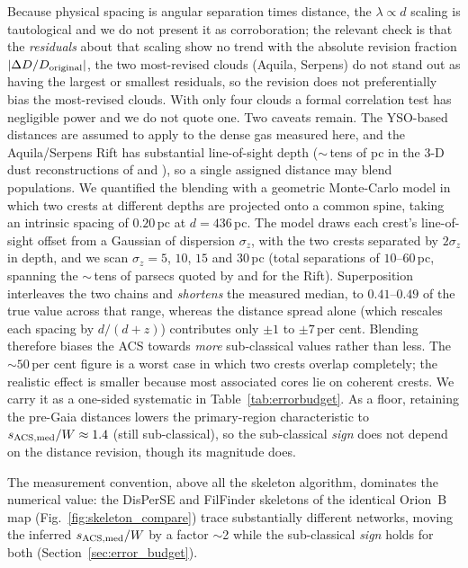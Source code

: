 \documentclass[usenatbib,twoside,twocolumn]{mnras}
\begin{document}
Because physical spacing is angular separation times distance, the $\lambda\propto d$ scaling is tautological and we do not present it as corroboration; the relevant check is that the \emph{residuals} about that scaling show no trend with the absolute revision fraction $|\Delta D/D_{\rm original}|$, the two most-revised clouds (Aquila, Serpens) do not stand out as having the largest or smallest residuals, so the revision does not preferentially bias the most-revised clouds. With only four clouds a formal correlation test has negligible power and we do not quote one. Two caveats remain. The YSO-based distances \citep{Zhang2023} are assumed to apply to the dense gas measured here, and the Aquila/Serpens Rift has substantial line-of-sight depth ($\sim$\,tens of pc in the 3-D dust reconstructions of \citealt{Zucker2020} and \citealt{Green2024}), so a single assigned distance may blend populations. We quantified the blending with a geometric Monte-Carlo model in which two crests at different depths are projected onto a common spine, taking an intrinsic spacing of $0.20$\,pc at $d=436$\,pc. The model draws each crest's line-of-sight offset from a Gaussian of dispersion $\sigma_z$, with the two crests separated by $2\sigma_z$ in depth, and we scan $\sigma_z=5$, $10$, $15$ and $30$\,pc (total separations of $10$--$60$\,pc, spanning the $\sim$\,tens of parsecs quoted by \citealt{Zucker2020} and \citealt{Green2024} for the Rift). Superposition interleaves the two chains and \emph{shortens} the measured median, to $0.41$--$0.49$ of the true value across that range, whereas the distance spread alone (which rescales each spacing by $d/(d+z)$) contributes only $\pm1$ to $\pm7$\,per cent. Blending therefore biases the ACS towards \emph{more} sub-classical values rather than less. The $\sim50$\,per cent figure is a worst case in which two crests overlap completely; the realistic effect is smaller because most associated cores lie on coherent crests. We carry it as a one-sided systematic in Table~\ref{tab:errorbudget}. As a floor, retaining the pre-Gaia distances lowers the primary-region characteristic to $s_{\rm ACS,med}/W\approx1.4$ (still sub-classical), so the sub-classical \emph{sign} does not depend on the distance revision, though its magnitude does.



The measurement convention, above all the skeleton algorithm, dominates the numerical value: the DisPerSE and FilFinder skeletons of the identical Orion~B map (Fig.~\ref{fig:skeleton_compare}) trace substantially different networks, moving the inferred $s_{\rm ACS,med}/W$ by a factor $\sim$2 while the sub-classical \emph{sign} holds for both (Section~\ref{sec:error_budget}).
\end{document}
